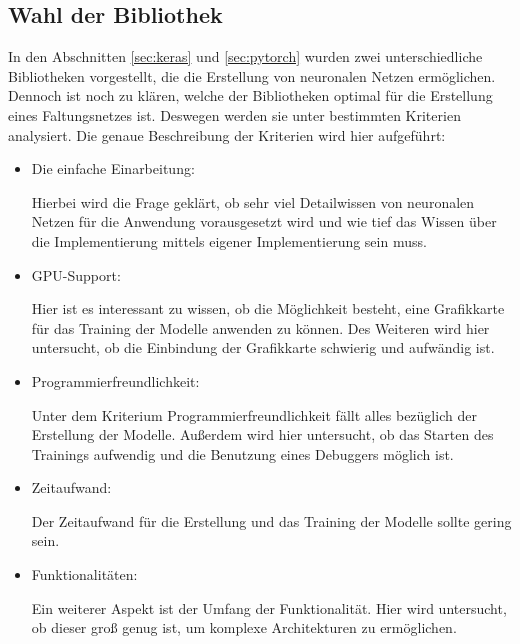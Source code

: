\subsection{Wahl der Bibliothek}


In den Abschnitten \ref{sec:keras} und \ref{sec:pytorch} wurden zwei unterschiedliche Bibliotheken vorgestellt, die die Erstellung von neuronalen Netzen ermöglichen. Dennoch ist noch zu klären, welche der Bibliotheken optimal für die Erstellung eines Faltungsnetzes ist. Deswegen werden sie unter bestimmten Kriterien analysiert. Die genaue Beschreibung der Kriterien wird hier aufgeführt:

\begin{itemize}
	\item Die einfache Einarbeitung:
	
	Hierbei wird die Frage geklärt, ob sehr viel Detailwissen von neuronalen Netzen für die Anwendung vorausgesetzt wird und wie tief das Wissen über die Implementierung mittels eigener Implementierung sein muss.
	
	\item GPU-Support:
	
	Hier ist es interessant zu wissen, ob die Möglichkeit besteht, eine Grafikkarte für das Training der Modelle anwenden zu können. Des Weiteren wird hier untersucht, ob die Einbindung der Grafikkarte schwierig und aufwändig ist.
	
	\item Programmierfreundlichkeit:

	Unter dem Kriterium Programmierfreundlichkeit fällt alles bezüglich der Erstellung der Modelle. Außerdem wird hier untersucht, ob das Starten des Trainings aufwendig und die Benutzung eines Debuggers möglich ist. 
	
	\item Zeitaufwand:
	
	Der Zeitaufwand für die Erstellung und das Training der Modelle sollte gering sein.
	 
	\item Funktionalitäten:
	
	Ein weiterer Aspekt ist der Umfang der Funktionalität. Hier wird untersucht, ob dieser groß genug ist, um komplexe Architekturen zu ermöglichen.
	
\end{itemize}

